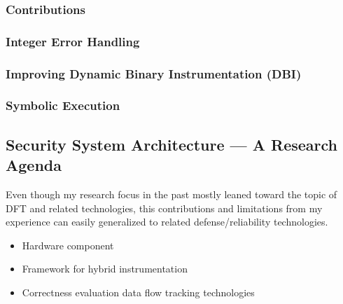 \documentclass[letterpaper, 10pt]{article}
\begin{document}
\begin{small}
\subsubsection*{Contributions}

\subsubsection*{Integer Error Handling}

\subsubsection*{Improving Dynamic Binary Instrumentation (DBI)}

\subsubsection*{Symbolic Execution}


\subsection*{Security System Architecture ---  A Research Agenda}
Even though my research focus in the past mostly leaned toward the topic of DFT
and related technologies, this contributions and limitations from my experience
can easily generalized to related defense/reliability technologies.

\begin{itemize}
  \item Hardware component
  \item Framework for hybrid instrumentation
  \item Correctness evaluation data flow tracking technologies
\end{itemize}
\end{small}



\end{document}
